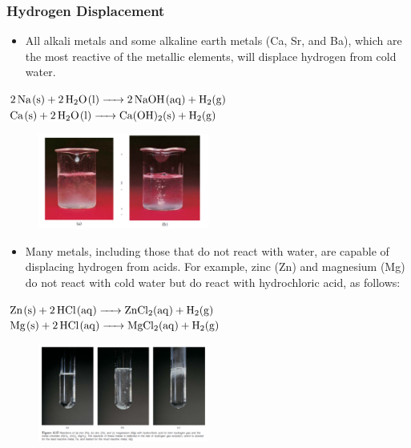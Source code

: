 \documentclass[a4paper,12pt,twocolumn]{article}
\begin{document}
\subsubsection{Hydrogen Displacement}
\begin{itemize}
  \item All alkali metals and some alkaline earth metals (Ca, Sr, and Ba), which are the most reactive of the metallic elements, will displace hydrogen from cold water.
\end{itemize}
\begin{Box1}{}
$\ce{2Na(s) + 2H2O(l) -> 2NaOH(aq) + H2(g)}$\\
$\ce{Ca(s) + 2H2O(l) -> Ca(OH)2(s) + H2(g)}$
\end{Box1}
\begin{figure}[h]
\centering
\includegraphics[width=0.5\textwidth]{hydrogen.png}
\end{figure}
\begin{itemize}
  \item Many metals, including those that do not react with water, are capable of displacing hydrogen from acids. For example, zinc (Zn) and magnesium (Mg) do not react with cold water but do react with hydrochloric acid, as follows:
\end{itemize}
\begin{Box1}{}
$\ce{Zn(s) + 2HCl(aq) -> ZnCl2(aq) + H2(g)}$\\
$\ce{Mg(s) + 2HCl(aq) -> MgCl2(aq) + H2(g)}$
\end{Box1}
\begin{figure}[h]
\centering
\includegraphics[width=0.5\textwidth]{hydrogen1.png}
\end{figure}
\end{document}
